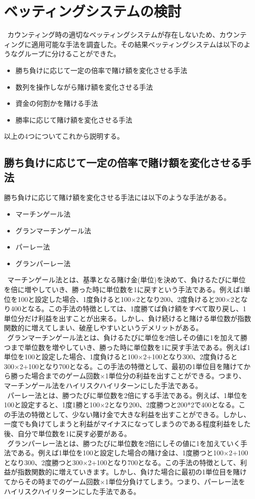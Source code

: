 \section{ベッティングシステムの検討}
\ カウンティング時の適切なベッティングシステムが存在しないため、カウンティングに適用可能な手法を調査した。その結果ベッティングシステムは以下のようなグループに分けることができた。
\begin{itemize}
\item 勝ち負けに応じて一定の倍率で賭け額を変化させる手法
\item 数列を操作しながら賭け額を変化させる手法
\item 資金の何割かを賭ける手法
\item 勝率に応じて賭け額を変化させる手法
\end{itemize}
以上の4つについてこれから説明する。

\subsection{勝ち負けに応じて一定の倍率で賭け額を変化させる手法}
勝ち負けに応じて賭け額を変化させる手法には以下のような手法がある。
 \begin{itemize}
 \item マーチンゲール法
 \item グランマーチンゲール法
 \item パーレー法
 \item グランパーレー法
 \end{itemize}
\ マーチンゲール法とは、基準となる賭け金(単位)を決めて、負けるたびに単位を倍に増やしていき、勝った時に単位数を1に戻すという手法である。例えば1単位を100と設定した場合、1度負けると100×2となり200、2度負けると200×2となり400となる。この手法の特徴としては、1度勝てば負け額をすべて取り戻し、1単位分だけ利益を出すことが出来る。しかし、負け続けると賭ける単位数が指数関数的に増えてしまい、破産しやすいというデメリットがある。\\
\ グランマーチンゲール法とは、負けるたびに単位を2倍しその値に1を加えて勝つまで単位数を増やしていき、勝った時に単位数を1に戻す手法である。例えば1単位を100と設定した場合、1度負けると100×2+100となり300、2度負けると300×2+100となり700となる。この手法の特徴として、最初の1単位目を賭けてから勝った場合までのゲーム回数×1単位分の利益を出すことができる。つまり、マーチンゲール法をハイリスクハイリターンにした手法である。\\
\ パーレー法とは、勝つたびに単位数を2倍にする手法である。例えば、1単位を100と設定すると、1度1勝と100×2となり200、2度勝つと200*2で400となる。この手法の特徴として、少ない賭け金で大きな利益を出すことができる。しかし、一度でも負けてしまうと利益がマイナスになってしまうのである程度利益をした後、自分で単位数を1に戻す必要がある。\\
\ グランパーレー法とは、勝つたびに単位数を2倍にしその値に1を加えていく手法である。例えば1単位を100と設定した場合の賭け金は、1度勝つと100×2+100となり300、2度勝つと300×2+100となり700となる。この手法の特徴として、利益が指数関数的に増えていきます。しかし、負けた場合に最初の1単位目を賭けてからその時までのゲーム回数×1単位分負けてしまう。つまり、パーレー法をハイリスクハイリターンにした手法である。\\

